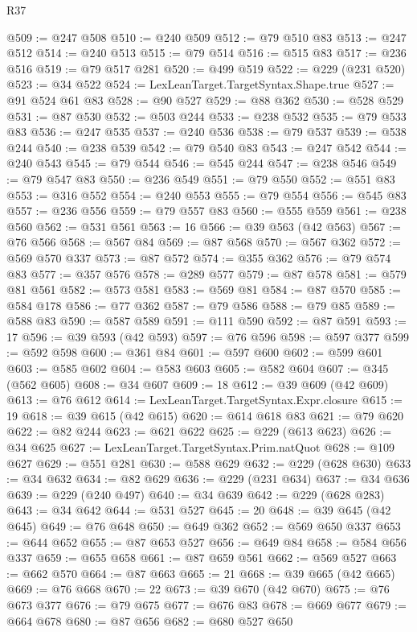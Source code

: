 \begin{lexlean}{R37}
\begin{coremodule}
@509 := @247 @508
@510 := @240 @509
@512 := @79 @510 @83
@513 := @247 @512
@514 := @240 @513
@515 := @79 @514
@516 := @515 @83
@517 := @236 @516
@519 := @79 @517 @281
@520 := @499 @519
@522 := @229 (@231 @520)
@523 := @34 @522
@524 := LexLeanTarget.TargetSyntax.Shape.true
@527 := @91 @524 @61 @83
@528 := @90 @527
@529 := @88 @362
@530 := @528 @529
@531 := @87 @530
@532 := @503 @244
@533 := @238 @532
@535 := @79 @533 @83
@536 := @247 @535
@537 := @240 @536
@538 := @79 @537
@539 := @538 @244
@540 := @238 @539
@542 := @79 @540 @83
@543 := @247 @542
@544 := @240 @543
@545 := @79 @544
@546 := @545 @244
@547 := @238 @546
@549 := @79 @547 @83
@550 := @236 @549
@551 := @79 @550
@552 := @551 @83
@553 := @316 @552
@554 := @240 @553
@555 := @79 @554
@556 := @545 @83
@557 := @236 @556
@559 := @79 @557 @83
@560 := @555 @559
@561 := @238 @560
@562 := @531 @561
@563 := 16
@566 := @39 @563 (@42 @563)
@567 := @76 @566
@568 := @567 @84
@569 := @87 @568
@570 := @567 @362
@572 := @569 @570 @337
@573 := @87 @572
@574 := @355 @362
@576 := @79 @574 @83
@577 := @357 @576
@578 := @289 @577
@579 := @87 @578
@581 := @579 @81 @561
@582 := @573 @581
@583 := @569 @81
@584 := @87 @570
@585 := @584 @178
@586 := @77 @362
@587 := @79 @586
@588 := @79 @85
@589 := @588 @83
@590 := @587 @589
@591 := @111 @590
@592 := @87 @591
@593 := 17
@596 := @39 @593 (@42 @593)
@597 := @76 @596
@598 := @597 @377
@599 := @592 @598
@600 := @361 @84
@601 := @597 @600
@602 := @599 @601
@603 := @585 @602
@604 := @583 @603
@605 := @582 @604
@607 := @345 (@562 @605)
@608 := @34 @607
@609 := 18
@612 := @39 @609 (@42 @609)
@613 := @76 @612
@614 := LexLeanTarget.TargetSyntax.Expr.closure
@615 := 19
@618 := @39 @615 (@42 @615)
@620 := @614 @618 @83
@621 := @79 @620
@622 := @82 @244
@623 := @621 @622
@625 := @229 (@613 @623)
@626 := @34 @625
@627 := LexLeanTarget.TargetSyntax.Prim.natQuot
@628 := @109 @627
@629 := @551 @281
@630 := @588 @629
@632 := @229 (@628 @630)
@633 := @34 @632
@634 := @82 @629
@636 := @229 (@231 @634)
@637 := @34 @636
@639 := @229 (@240 @497)
@640 := @34 @639
@642 := @229 (@628 @283)
@643 := @34 @642
@644 := @531 @527
@645 := 20
@648 := @39 @645 (@42 @645)
@649 := @76 @648
@650 := @649 @362
@652 := @569 @650 @337
@653 := @644 @652
@655 := @87 @653 @527
@656 := @649 @84
@658 := @584 @656 @337
@659 := @655 @658
@661 := @87 @659 @561
@662 := @569 @527
@663 := @662 @570
@664 := @87 @663
@665 := 21
@668 := @39 @665 (@42 @665)
@669 := @76 @668
@670 := 22
@673 := @39 @670 (@42 @670)
@675 := @76 @673 @377
@676 := @79 @675
@677 := @676 @83
@678 := @669 @677
@679 := @664 @678
@680 := @87 @656
@682 := @680 @527 @650

\end{coremodule}
\end{lexlean}
